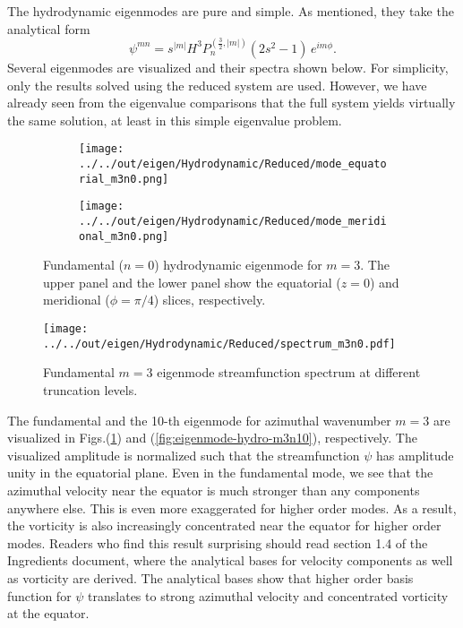 The hydrodynamic eigenmodes are pure and simple.
As mentioned, they take the analytical form
\[
    \psi^{mn} = s^{|m|}H^3 P_n^{\left(\frac{3}{2}, |m|\right)}(2s^2 - 1)\, e^{im\phi}.
\]
Several eigenmodes are visualized and their spectra shown below.
For simplicity, only the results solved using the reduced system are used. However, we have already seen from the eigenvalue comparisons that the full system yields virtually the same solution, at least in this simple eigenvalue problem.

\begin{figure}[htbp]
    \centering
    \begin{subfigure}[b]{\linewidth}
        \texttt{[image: ../../out/eigen/Hydrodynamic/Reduced/mode\_equatorial\_m3n0.png]}
    \end{subfigure}
    \begin{subfigure}[b]{\linewidth}
        \texttt{[image: ../../out/eigen/Hydrodynamic/Reduced/mode\_meridional\_m3n0.png]}
    \end{subfigure}
    \caption{Fundamental ($n=0$) hydrodynamic eigenmode for $m=3$. The upper panel and the lower panel show the equatorial ($z=0$) and meridional ($\phi=\pi/4$) slices, respectively.}
    \label{fig:eigenmode-hydro-m3n0}
\end{figure}

\begin{figure}[htbp]
    \centering
    \texttt{[image: ../../out/eigen/Hydrodynamic/Reduced/spectrum\_m3n0.pdf]}
    \caption{Fundamental $m=3$ eigenmode streamfunction spectrum at different truncation levels.}
    \label{fig:modespec-hydro-m3n0}
\end{figure}

The fundamental and the 10-th eigenmode for azimuthal wavenumber $m=3$ are visualized in Figs.(\ref{fig:eigenmode-hydro-m3n0}) and (\ref{fig:eigenmode-hydro-m3n10}), respectively. The visualized amplitude is normalized such that the streamfunction $\psi$ has amplitude unity in the equatorial plane.
Even in the fundamental mode, we see that the azimuthal velocity near the equator is much stronger than any components anywhere else.
This is even more exaggerated for higher order modes. As a result, the vorticity is also increasingly concentrated near the equator for higher order modes.
Readers who find this result surprising should read section 1.4 of the Ingredients document, where the analytical bases for velocity components as well as vorticity are derived. The analytical bases show that higher order basis function for $\psi$ translates to strong azimuthal velocity and concentrated vorticity at the equator.

